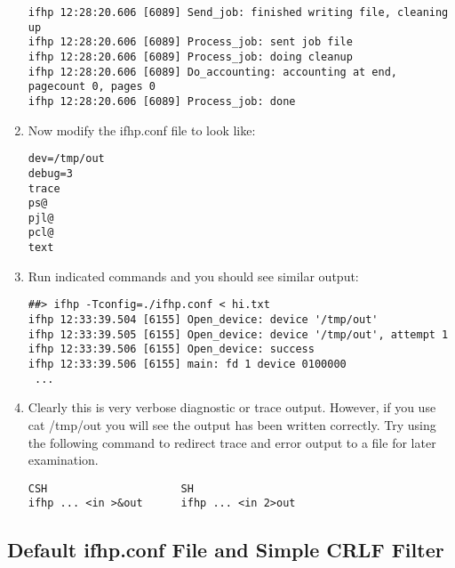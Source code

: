 \documentclass[a4paper]{article}
\begin{document}
\begin{enumerate}
\begin{tscreen}
\begin{verbatim}
ifhp 12:28:20.606 [6089] Send_job: finished writing file, cleaning up
ifhp 12:28:20.606 [6089] Process_job: sent job file
ifhp 12:28:20.606 [6089] Process_job: doing cleanup
ifhp 12:28:20.606 [6089] Do_accounting: accounting at end, pagecount 0, pages 0
ifhp 12:28:20.606 [6089] Process_job: done
\end{verbatim}
\end{tscreen}
\item Now modify the
{\ttfamily ifhp.conf} file to look like:
\begin{tscreen}
\begin{verbatim}
dev=/tmp/out
debug=3
trace
ps@ 
pjl@
pcl@
text
\end{verbatim}
\end{tscreen}
\item Run indicated commands and you should see similar output:
\begin{tscreen}
\begin{verbatim}
##> ifhp -Tconfig=./ifhp.conf < hi.txt
ifhp 12:33:39.504 [6155] Open_device: device '/tmp/out'
ifhp 12:33:39.505 [6155] Open_device: device '/tmp/out', attempt 1
ifhp 12:33:39.506 [6155] Open_device: success
ifhp 12:33:39.506 [6155] main: fd 1 device 0100000
 ...
\end{verbatim}
\end{tscreen}
\item Clearly this is very verbose diagnostic or trace output.  However,
if you use
{\ttfamily cat /tmp/out}
you will see the output has been written correctly.
Try using the following command to redirect trace and error output
to a file for later examination.
\begin{tscreen}
\begin{verbatim}
CSH                     SH
ifhp ... <in >&out      ifhp ... <in 2>out
\end{verbatim}
\end{tscreen}
\end{enumerate}



\subsection{Default ifhp.conf File and Simple CRLF Filter}
\end{document}
